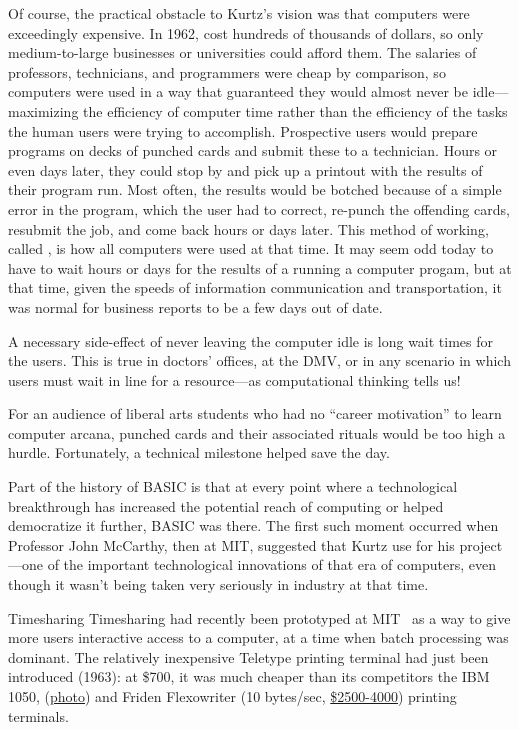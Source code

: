 \documentclass{article}
\begin{document}
Of course, the practical obstacle to Kurtz's vision was that
computers were exceedingly expensive.  In 1962,  
cost hundreds of thousands of dollars, so only medium-to-large 
businesses or universities could afford them.  
The salaries of professors, technicians, and programmers were
cheap by comparison, so computers were used in a way that guaranteed
they would almost never be idle---maximizing the efficiency of computer
time rather than the efficiency of the tasks the human users were trying
to accomplish.
Prospective users would prepare programs on decks of punched
cards and submit these to a technician.  
Hours or even days later, they
could stop by and pick up a printout with the results of their program run.
Most often, the results would be botched because of a simple error in
the program, which the user had to correct, re-punch the offending
cards, resubmit the job, and come back hours or days later.  This method
of working, called , is how all computers were used
at that time.  
It may seem odd today to have to wait hours or days for the results of a
running a computer progam, but at that time, given the speeds of information communication and
transportation, it was  normal for business
reports to be a few days out of date.

  \begin{geeknote}
  A necessary side-effect of never leaving the computer idle is long wait
  times for the users.  This is true in doctors' offices, at the DMV, or
  in any scenario in which users must wait in line for a resource---as
  computational thinking tells us!
  \end{geeknote}

For an audience of liberal arts students who had no ``career
motivation'' to learn computer arcana, punched cards and their associated
rituals would be too high a hurdle.
Fortunately, a technical milestone helped save the day.

Part of the history of BASIC is that at every point where a
technological breakthrough has increased the potential reach of
computing or helped democratize it further, BASIC was there.  The first
such moment occurred when
Professor John McCarthy, then at MIT, suggested that Kurtz use
  for his project---one of the important technological
innovations of that era of computers, even though it wasn't being taken
very seriously in industry at that time.

\begin{milestone}{Timesharing}
Timesharing had recently been prototyped at
MIT~\cite{corbato62timesharing} as a way to give more users interactive
access to a computer, at a time when
batch processing was dominant.
The relatively inexpensive Teletype
 printing terminal had just been introduced (1963): at \$700,
it was much cheaper than its competitors the IBM 1050, 
(\href{http://www.science.uva.nl/museum/ibm1050.php}{photo}) and
Friden Flexowriter (10 bytes/sec,
\href{http://retrotechnology.com/herbs_stuff/flex_behr.html}{\$2500-4000})
printing terminals.
\end{milestone}
\end{document}
